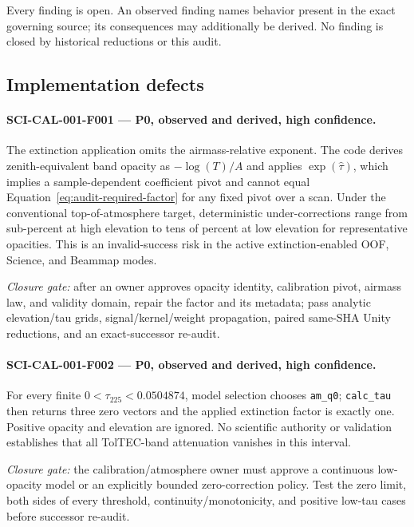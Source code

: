 \documentclass[11pt]{article}
\newcommand{\code}[1]{\nolinkurl{#1}}
\begin{document}
Every finding is open.  An observed finding names behavior present in the
exact governing source; its consequences may additionally be derived.  No
finding is closed by historical reductions or this audit.

\subsection{Implementation defects}

\paragraph{SCI-CAL-001-F001 --- P0, observed and derived, high confidence.}
The extinction application omits the airmass-relative exponent.  The code
derives zenith-equivalent band opacity as \(-\log(T)/A\) and applies
\(\exp(\widehat\tau)\), which implies a sample-dependent coefficient pivot
and cannot equal Equation~\eqref{eq:audit-required-factor} for any fixed pivot
over a scan.  Under the conventional top-of-atmosphere target, deterministic
under-corrections range from sub-percent at high elevation to tens of percent
at low elevation for representative opacities.  This is an invalid-success
risk in the active extinction-enabled OOF, Science, and Beammap modes.

\emph{Closure gate:} after an owner approves opacity identity, calibration
pivot, airmass law, and validity domain, repair the factor and its metadata;
pass analytic elevation/tau grids, signal/kernel/weight propagation, paired
same-SHA Unity reductions, and an exact-successor re-audit.

\paragraph{SCI-CAL-001-F002 --- P0, observed and derived, high confidence.}
For every finite \(0<\tau_{225}<0.0504874\), model selection chooses
\code{am_q0}; \code{calc_tau} then returns three zero vectors and the applied
extinction factor is exactly one.  Positive opacity and elevation are ignored.
No scientific authority or validation establishes that all TolTEC-band
attenuation vanishes in this interval.

\emph{Closure gate:} the calibration/atmosphere owner must approve a continuous
low-opacity model or an explicitly bounded zero-correction policy.  Test the
zero limit, both sides of every threshold, continuity/monotonicity, and
positive low-tau cases before successor re-audit.
\end{document}
